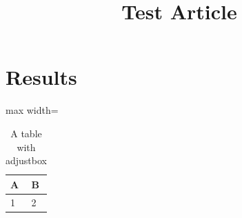 \documentclass{ccr}
\title{Test Article}
\begin{document}
\maketitle

\section{Results}

\begin{table}[h]
\centering
\caption{A table with adjustbox}
\begin{adjustbox}{max width=\linewidth}
\begin{tabularx}{\linewidth}{ll}
\hline
A & B \\
\hline
1 & 2 \\
\hline
\end{tabularx}
\end{adjustbox}
\end{table}

\printbibliography
\end{document}

